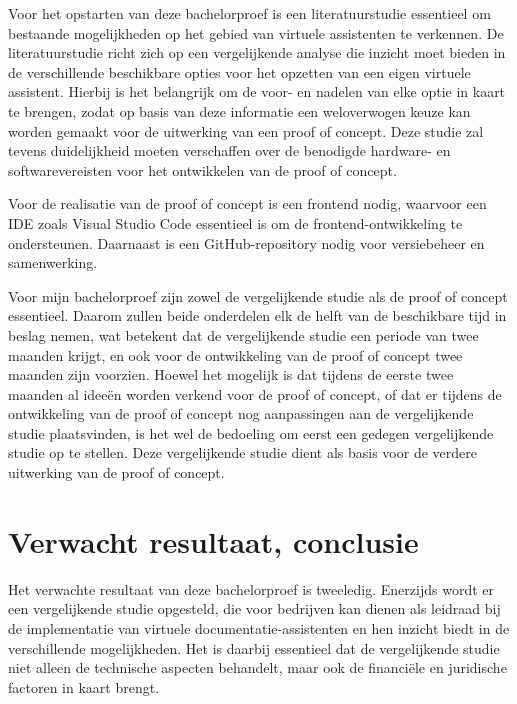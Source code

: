 Voor het opstarten van deze bachelorproef is een literatuurstudie essentieel om bestaande mogelijkheden op het gebied van virtuele assistenten te verkennen. De literatuurstudie richt zich op een vergelijkende analyse die inzicht moet bieden in de verschillende beschikbare opties voor het opzetten van een eigen virtuele assistent. Hierbij is het belangrijk om de voor- en nadelen van elke optie in kaart te brengen, zodat op basis van deze informatie een weloverwogen keuze kan worden gemaakt voor de uitwerking van een proof of concept. Deze studie zal tevens duidelijkheid moeten verschaffen over de benodigde hardware- en softwarevereisten voor het ontwikkelen van de proof of concept.

Voor de realisatie van de proof of concept is een frontend nodig, waarvoor een IDE zoals Visual Studio Code essentieel is om de frontend-ontwikkeling te ondersteunen. Daarnaast is een GitHub-repository nodig voor versiebeheer en samenwerking.

Voor mijn bachelorproef zijn zowel de vergelijkende studie als de proof of concept essentieel. Daarom zullen beide onderdelen elk de helft van de beschikbare tijd in beslag nemen, wat betekent dat de vergelijkende studie een periode van twee maanden krijgt, en ook voor de ontwikkeling van de proof of concept twee maanden zijn voorzien. Hoewel het mogelijk is dat tijdens de eerste twee maanden al ideeën worden verkend voor de proof of concept, of dat er tijdens de ontwikkeling van de proof of concept nog aanpassingen aan de vergelijkende studie plaatsvinden, is het wel de bedoeling om eerst een gedegen vergelijkende studie op te stellen. Deze vergelijkende studie dient als basis voor de verdere uitwerking van de proof of concept.

\section{Verwacht resultaat, conclusie}%
\label{sec:verwachte_resultaten}

Het verwachte resultaat van deze bachelorproef is tweeledig. Enerzijds wordt er een vergelijkende studie opgesteld, die voor bedrijven kan dienen als leidraad bij de implementatie van virtuele documentatie-assistenten en hen inzicht biedt in de verschillende mogelijkheden. Het is daarbij essentieel dat de vergelijkende studie niet alleen de technische aspecten behandelt, maar ook de financiële en juridische factoren in kaart brengt.

